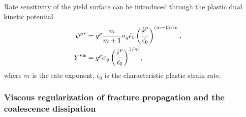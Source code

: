 Rate sensitivity of the yield surface can be introduced through the plastic dual kinetic potential
\begin{subequations}
  \begin{align}
    {\psi^p}^*   & = g^p \dfrac{m}{m+1} \sigma_y \dot{\epsilon}_0 \left( \dfrac{\epdot}{\dot{\epsilon_0}} \right)^{(m+1)/m}, \\
    Y^\text{vis} & = g^p \sigma_y \left( \dfrac{\epdot}{\dot{\epsilon_0}} \right)^{1/m},                                     
  \end{align}
\end{subequations}
where $m$ is the rate exponent, $\dot{\epsilon_0}$ is the characteristic plastic strain rate.

\subsubsection{Viscous regularization of fracture propagation and the coalescence dissipation}
\label{section: chapter5/theory/fracture}

